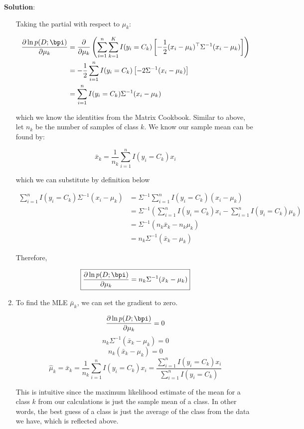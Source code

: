 \documentclass[submit]{../harvardml}
\newenvironment{solution}{
    \vspace{2mm}
    \color{blue}\noindent\textbf{Solution}:
}{}
\begin{document}
\begin{solution}
\begin{enumerate}
    Taking the partial with respect to $\mu_k$:

    \begin{align*}
        \frac{\partial\ln p (D;\bpi)}{\partial \mu_k} &= \frac{\partial}{\partial \mu_k} \left(\sum_{i=1}^n\sum_{k=1}^K I(y_i=C_k)\left[-\frac{1}{2}(x_i - \mu_k)^\top \Sigma^{-1} (x_i - \mu_k)\right]\right) \\
        &= -\frac{1}{2} \sum_{i=1}^n I(y_i = C_k) \left[-2 \Sigma^{-1}(x_i - \mu_k)\right] \\
        &= \sum_{i=1}^n I(y_i = C_k) \Sigma^{-1}(x_i - \mu_k)
    \end{align*}

    which we know the identities from the Matrix Cookbook. Similar to above, let $n_k$ be the number of samples of class $k$. We know our sample mean can be found by:

    \[
    \bar{x}_k = \frac{1}{n_k} \sum_{i=1}^n I(y_i = C_k) x_i
    \]

    which we can substitute by definition below

    \begin{align*}
        \sum_{i=1}^n I(y_i = C_k) \Sigma^{-1}(x_i - \mu_k) &= \Sigma^{-1}\sum_{i=1}^n I(y_i = C_k) (x_i - \mu_k) \\
        &= \Sigma^{-1} \left(\sum_{i=1}^n I(y_i = C_k) x_i - \sum_{i=1}^n I(y_i = C_k) \mu_k\right) \\
        &= \Sigma^{-1}(n_k\bar{x}_k - n_k\mu_k) \\
        &= n_k \Sigma^{-1}(\bar{x}_k - \mu_k)
    \end{align*}

    Therefore,

    \[
    \boxed{\frac{\partial\ln p (D;\bpi)}{\partial \mu_k}  = n_k \Sigma^{-1}(\bar{x}_k - \mu_k)}
    \]

    \item To find the MLE $\bar{\mu}_k$, we can set the gradient to zero.

    \[
    \frac{\partial\ln p (D;\bpi)}{\partial \mu_k}  = 0
    \]
    \[
    n_k \Sigma^{-1}(\bar{x}_k - \mu_k) = 0
    \]
    \[
    n_k (\bar{x}_k - \mu_k) = 0
    \]
    \[
    \boxed{\hat{\mu}_k = \bar{x}_k = \frac{1}{n_k} \sum_{i=1}^n I(y_i=C_k)x_i = \frac{\sum_{i=1}^n I(y_i=C_k)x_i}{\sum_{i=1}^n I(y_i=C_k)}}
    \]

    This is intuitive since the maximum likelihood estimate of the mean for a class $k$ from our calculations is just the sample mean of a class. In other words, the best guess of a class is just the average of the class from the data we have, which is reflected above.


\end{enumerate}
\end{solution}
\end{document}
